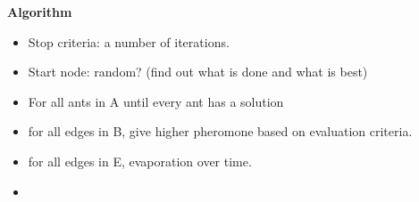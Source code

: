 \textbf{Algorithm}
\begin{itemize}
\item Stop criteria: a number of iterations. 
\item Start node: random? (find out what is done and what is best)
\item For all ants in A until every ant has a solution
\item for all edges in B, give higher pheromone based on evaluation criteria. 
\item for all edges in E, evaporation over time. 
\item 
\end{itemize}


